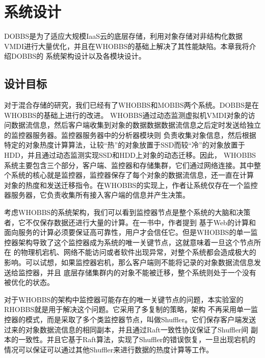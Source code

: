 
\chapter{系统设计}
\label{chap:systemdesign}
DOBBS是为了适应大规模IaaS云的底层存储，利用对象存储对非结构化数据VMDI进行大量优化，并且在WHOBBS的基础上解决了其性能缺陷。本章我将介绍DOBBS的
系统架构设计以及各模块设计。

\section{设计目标}
对于混合存储的研究，我们已经有了WHOBBS和MOBBS两个系统。DOBBS是在WHOBBS的基础上进行的改进。
WHOBBS通过动态监测虚拟机VMDI对象的访问数据流信息，然后客户端收集到对象的数据数据数据流信息之后定时发送给独立的监控器服务器。监控器服务器中的分析器模块则
负责收集对象信息，然后根据特定的对象热度计算算法，让较“热”的对象放置于SSD而较“冷”的对象放置于HDD，并且通过动态监测实现SSD和HDD上对象的动态迁移。因此，
WHOBBS系统主要包含三个部分，客户端、监控器和存储集群，它们通过网络连接。其中整个系统的核心就是监控器，监控器保存了每个对象的数据流信息，还一直在计算
对象的热度和发送迁移指令。在WHOBBS的实现上，作者让系统仅存在一个监控器服务器，它负责收集所有接入客户端的信息并产生决策。

考虑WHOBBS的系统架构，我们可以看到监控器节点是整个系统的大脑和决策者，它不仅保存数据还进行大量的计算。在一书中，作者提到
基于Web的计算和面向服务的计算必须要保证高可靠性，用户才会信任它。但是WHOBBS的单一监控器架构导致了这个监控器成为系统的唯一关键节点，这就意味着一旦这个节点所在
的物理机宕机、网络不能访问或者软件出现异常，对整个系统都会造成极大的影响。可以试想，如果监控器宕机，那么客户端则不能将记录的对象数据流信息发送给监控器，并且
底层存储集群内的对象不能被迁移，整个系统则处于一个没有被优化的状态。

对于WHOBBS的架构中监控器可能存在的唯一关键节点的问题，本实验室的RHOBBS\cite{zhenwang2016rhobbs}就是用于解决这个问题。它采用了多复制的策略，架构
不再采用单一监控器的模式，而是采取了多个类监控器节点，叫做Shuffler。它们保存客户端发送过来的对象数据流信息的相同副本，并且通过Raft一致性协议保证了Shuffler间
副本的一致性。并且它基于Raft算法，实现了Shuffler的错误恢复，一旦出现宕机的情况可以保证可以通过其他Shuffler来进行数据的热度计算等工作。

